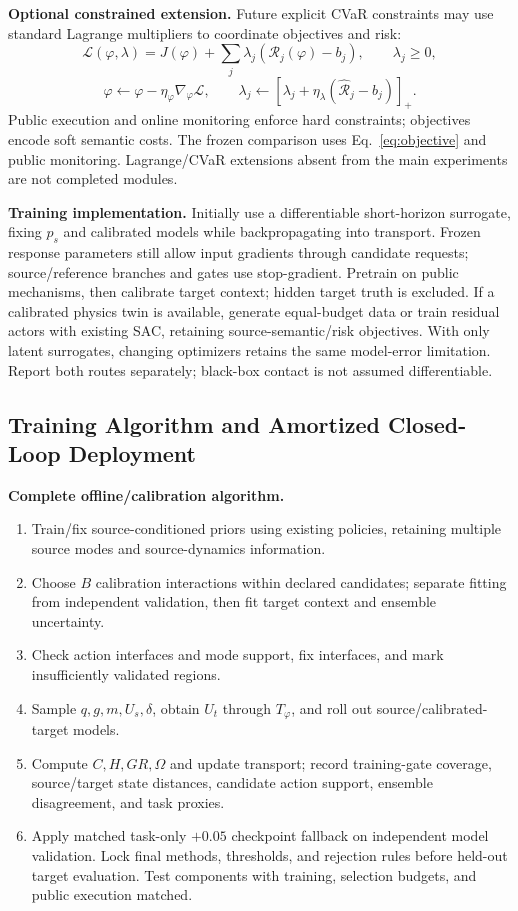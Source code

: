 \documentclass[11pt]{article}
\begin{document}
\textbf{Optional constrained extension.} Future explicit CVaR constraints may use
standard Lagrange multipliers to coordinate objectives and risk:
\begin{equation}
 \mathcal L(\varphi,\lambda)
 =J(\varphi)+\sum_j\lambda_j(\mathcal R_j(\varphi)-b_j),
 \qquad\lambda_j\ge0,
\end{equation}
\begin{equation}
 \varphi\leftarrow\varphi-\eta_\varphi\nabla_\varphi\mathcal L,
 \qquad
 \lambda_j\leftarrow[\lambda_j+\eta_\lambda(\widehat{\mathcal R}_j-b_j)]_+.
 \label{eq:lagrange}
\end{equation}
Public execution and online monitoring enforce hard constraints; objectives encode
soft semantic costs. The frozen comparison uses Eq.~\eqref{eq:objective} and public
monitoring. Lagrange/CVaR extensions absent from the main experiments are not completed modules.

\textbf{Training implementation.} Initially use a differentiable short-horizon surrogate,
fixing $p_s$ and calibrated models while backpropagating into transport. Frozen response
parameters still allow input gradients through candidate requests; source/reference
branches and gates use stop-gradient. Pretrain on public mechanisms, then calibrate
target context; hidden target truth is excluded. If a calibrated physics twin is
available, generate equal-budget data or train residual actors with existing SAC,
retaining source-semantic/risk objectives. With only latent surrogates, changing
optimizers retains the same model-error limitation. Report both routes separately;
black-box contact is not assumed differentiable.

\subsection{Training Algorithm and Amortized Closed-Loop Deployment}
\label{sec:deployment}
\textbf{Complete offline/calibration algorithm.}
\begin{enumerate}
\item Train/fix source-conditioned priors using existing policies, retaining multiple source modes and source-dynamics information.
\item Choose $B$ calibration interactions within declared candidates; separate fitting from independent validation, then fit target context and ensemble uncertainty.
\item Check action interfaces and mode support, fix interfaces, and mark insufficiently validated regions.
\item Sample $q,g,m,U_s,\delta$, obtain $U_t$ through $T_\varphi$, and roll out source/calibrated-target models.
\item Compute $C,H,G R,\Omega$ and update transport; record training-gate coverage, source/target state distances, candidate action support, ensemble disagreement, and task proxies.
\item Apply matched task-only $+0.05$ checkpoint fallback on independent model validation. Lock final methods, thresholds, and rejection rules before held-out target evaluation. Test components with training, selection budgets, and public execution matched.
\end{enumerate}
\end{document}
